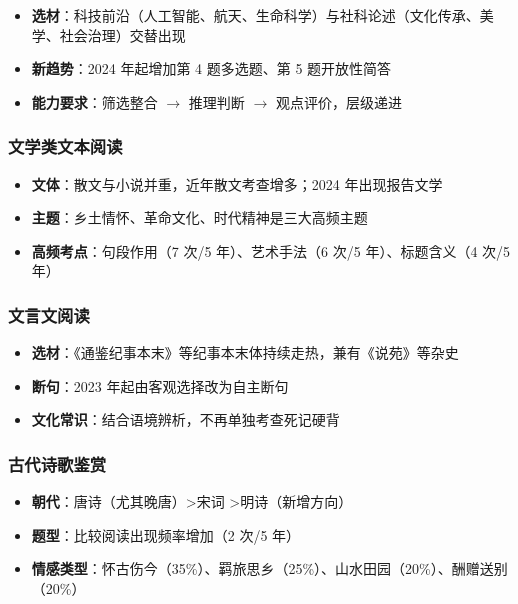 \begin{itemize}
  \item \textbf{选材}：科技前沿（人工智能、航天、生命科学）与社科论述（文化传承、美学、社会治理）交替出现
  \item \textbf{新趋势}：2024 年起增加第 4 题多选题、第 5 题开放性简答
  \item \textbf{能力要求}：筛选整合 $\to$ 推理判断 $\to$ 观点评价，层级递进
\end{itemize}

\subsubsection{文学类文本阅读}

\begin{itemize}
  \item \textbf{文体}：散文与小说并重，近年散文考查增多；2024 年出现报告文学
  \item \textbf{主题}：乡土情怀、革命文化、时代精神是三大高频主题
  \item \textbf{高频考点}：句段作用（7 次/5 年）、艺术手法（6 次/5 年）、标题含义（4 次/5 年）
\end{itemize}

\subsubsection{文言文阅读}

\begin{itemize}
  \item \textbf{选材}：《通鉴纪事本末》等纪事本末体持续走热，兼有《说苑》等杂史
  \item \textbf{断句}：2023 年起由客观选择改为自主断句
  \item \textbf{文化常识}：结合语境辨析，不再单独考查死记硬背
\end{itemize}

\subsubsection{古代诗歌鉴赏}

\begin{itemize}
  \item \textbf{朝代}：唐诗（尤其晚唐）\textgreater 宋词 \textgreater 明诗（新增方向）
  \item \textbf{题型}：比较阅读出现频率增加（2 次/5 年）
  \item \textbf{情感类型}：怀古伤今（35\%）、羁旅思乡（25\%）、山水田园（20\%）、酬赠送别（20\%）
\end{itemize}

